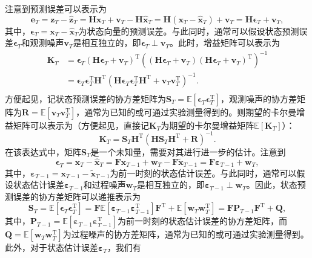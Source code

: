 注意到预测误差可以表示为
\[
    \bm{e}_T = \bm{z}_T - \hat{\bm{z}}_T = \mathbf{H} \bm{x}_T + \bm{v}_T - \mathbf{H} \hat{\bm{x}}_T = \mathbf{H} (\bm{x}_T - \hat{\bm{x}}_T) + \bm{v}_T = \mathbf{H} \bm{\epsilon}_T + \bm{v}_T,
\]
其中，\( \bm{\epsilon}_T = \bm{x}_T - \hat{\bm{x}}_T \)为状态向量的预测误差。与此同时，通常可以假设状态预测误差\( \bm{\epsilon}_T \)和观测噪声\( \bm{v}_T \)是相互独立的，即\( \bm{\epsilon}_T \perp \bm{v}_T \)。此时，增益矩阵可以表示为
\[
    \begin{split}
        \mathbf{K}_T & = \bm{\epsilon}_T (\mathbf{H} \bm{\epsilon}_T + \bm{v}_T)^{\mathrm{T}} \left( (\mathbf{H} \bm{\epsilon}_T + \bm{v}_T) (\mathbf{H} \bm{\epsilon}_T + \bm{v}_T)^{\mathrm{T}} \right)^{-1}                      \\
                     & = \bm{\epsilon}_T \bm{\epsilon}_T^{\mathrm{T}} \mathbf{H}^{\mathrm{T}} \left( \mathbf{H} \bm{\epsilon}_T \bm{\epsilon}_T^{\mathrm{T}} \mathbf{H}^{\mathrm{T}} + \bm{v}_T \bm{v}_T^{\mathrm{T}} \right)^{-1}. \\
    \end{split}
\]
方便起见，记状态预测误差的协方差矩阵为\( \mathbf{S}_T = \mathbb{E}[\bm{\epsilon}_T \bm{\epsilon}_T^{\mathrm{T}}] \)，观测噪声的协方差矩阵为\( \mathbf{R} = \mathbb{E}[\bm{v}_T \bm{v}_T^{\mathrm{T}}] \)，通常为已知的或可通过实验测量得到的。则期望的卡尔曼增益矩阵可以表示为（方便起见，直接记\( \mathbf{K}_T \)为期望的卡尔曼增益矩阵\( \mathbb{E}[\mathbf{K}_T] \)）：
\[
    \mathbf{K}_T = \mathbf{S}_T \mathbf{H}^{\mathrm{T}} \left( \mathbf{H} \mathbf{S}_T \mathbf{H}^{\mathrm{T}} + \mathbf{R} \right)^{-1}.
\]
在该表达式中，矩阵\( \mathbf{S}_T \)是一个未知量，需要对其进行进一步的估计。注意到
\[
    \bm{\epsilon}_T = \bm{x}_T - \hat{\bm{x}}_T = \mathbf{F} \bm{x}_{T-1} + \bm{w}_T - \mathbf{F} \tilde{\bm{x}}_{T-1} = \mathbf{F} \bm{\varepsilon }_{T-1} + \bm{w}_T,
\]
其中，\( \bm{\varepsilon}_{T-1} = \bm{x}_{T-1} - \tilde{\bm{x}}_{T-1} \)为前一时刻的状态估计误差。与此同时，通常可以假设状态估计误差\( \bm{\varepsilon}_{T-1} \)和过程噪声\( \bm{w}_T \)是相互独立的，即\( \bm{\varepsilon}_{T-1} \perp \bm{w}_T \)。因此，状态预测误差的协方差矩阵可以递推表示为
\[
    \mathbf{S}_T = \mathbb{E}[\bm{\epsilon}_T \bm{\epsilon}_T^{\mathrm{T}}] = \mathbf{F} \mathbb{E}[\bm{\varepsilon}_{T-1} \bm{\varepsilon}_{T-1}^{\mathrm{T}}] \mathbf{F}^{\mathrm{T}} + \mathbb{E}[\bm{w}_T \bm{w}_T^{\mathrm{T}}] = \mathbf{F} \mathbf{P}_{T-1} \mathbf{F}^{\mathrm{T}} + \mathbf{Q},
\]
其中，\( \mathbf{P}_{T-1} = \mathbb{E}[\bm{\varepsilon}_{T-1} \bm{\varepsilon}_{T-1}^{\mathrm{T}}] \)为前一时刻的状态估计误差的协方差矩阵，而\( \mathbf{Q} = \mathbb{E}[\bm{w}_T \bm{w}_T^{\mathrm{T}}] \)为过程噪声的协方差矩阵，通常为已知的或可通过实验测量得到。此外，对于状态估计误差\( \bm{\varepsilon}_T \)，我们有

